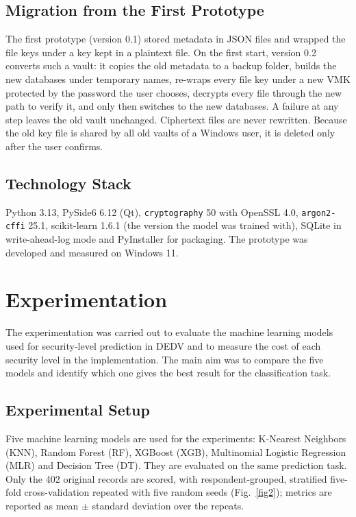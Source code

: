 \documentclass[pdflatex,sn-mathphys-num]{sn-jnl}
\newcommand{\code}[1]{\texttt{#1}}
\begin{document}
\subsection{Migration from the First Prototype}

The first prototype (version 0.1) stored metadata in JSON files and wrapped the file keys under a
key kept in a plaintext file. On the first start, version 0.2 converts such a vault: it copies the
old metadata to a backup folder, builds the new databases under temporary names, re-wraps every
file key under a new VMK protected by the password the user chooses, decrypts every file through
the new path to verify it, and only then switches to the new databases. A failure at any step
leaves the old vault unchanged. Ciphertext files are never rewritten. Because the old key file is
shared by all old vaults of a Windows user, it is deleted only after the user confirms.

\subsection{Technology Stack}

Python 3.13, PySide6 6.12 (Qt), \code{cryptography} 50 with OpenSSL 4.0, \code{argon2-cffi} 25.1,
scikit-learn 1.6.1 (the version the model was trained with), SQLite in write-ahead-log mode and
PyInstaller for packaging. The prototype was developed and measured on Windows 11.

\section{Experimentation}\label{sec7}

The experimentation was carried out to evaluate the machine learning models used for
security-level prediction in DEDV and to measure the cost of each security level in the
implementation. The main aim was to compare the five models and identify which one gives the best
result for the classification task.

\subsection{Experimental Setup}

Five machine learning models are used for the experiments: K-Nearest Neighbors (KNN), Random
Forest (RF), XGBoost (XGB), Multinomial Logistic Regression (MLR) and Decision Tree (DT). They are
evaluated on the same prediction task. Only the 402 original records are scored, with
respondent-grouped, stratified five-fold cross-validation repeated with five random seeds
(Fig.~\ref{fig2}); metrics are reported as mean $\pm$ standard deviation over the repeats.
\end{document}
